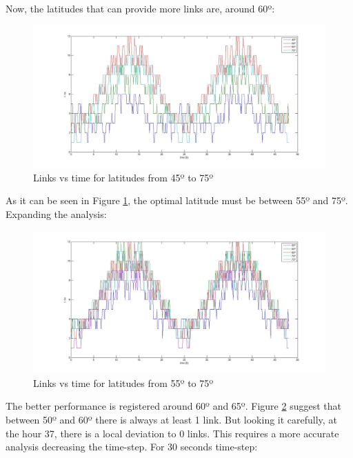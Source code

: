 Now, the latitudes that can provide more links are, around 60º:
\begin{figure}[H]
\begin{center}
\includegraphics[scale=0.30]{45_10_75_lat.jpg}
\caption{Links vs time for latitudes from 45º to 75º}
\label{fig:lat4}
\end{center}
\end{figure}
As it can be seen in Figure \ref{fig:lat4}, the optimal latitude must be between 55º and 75º. Expanding the analysis:
\begin{figure}[H]
\begin{center}
\includegraphics[scale=0.30]{55_5_75_lat.jpg}
\caption{Links vs time for latitudes from 55º to 75º}
\label{fig:lat5}
\end{center}
\end{figure}
The better performance is registered around 60º and 65º. Figure \ref{fig:lat5} suggest that between 50º and 60º there is always at least 1 link. But looking it carefully, at the hour 37, there is a local deviation to 0 links. This requires a more accurate analysis decreasing the time-step. For 30 seconds time-step:
